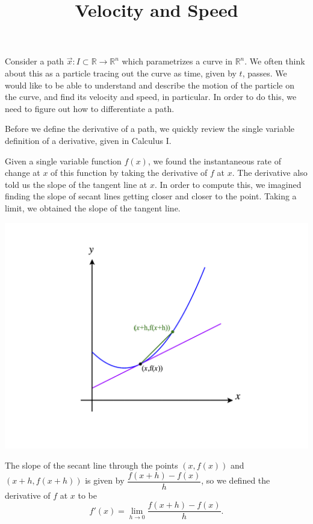 \documentclass{ximera}
\title{Velocity and Speed}
\begin{document}
\begin{abstract}
\end{abstract}
\maketitle


Consider a path $\vec{x}:I\subset\mathbb{R}\rightarrow\mathbb{R}^n$ which parametrizes a curve in $\mathbb{R}^n$. We often think about this as a particle tracing out the curve as time, given by $t$, passes. We would like to be able to understand and describe the motion of the particle on the curve, and find its velocity and speed, in particular. In order to do this, we need to figure out how to differentiate a path.

Before we define the derivative of a path, we quickly review the single variable definition of a derivative, given in Calculus I.

Given a single variable function $f(x)$, we found the instantaneous rate of change at $x$ of this function by taking the derivative of $f$ at $x$. The derivative also told us the slope of the tangent line at $x$. In order to compute this, we imagined finding the slope of secant lines getting closer and closer to the point. Taking a limit, we obtained the slope of the tangent line.

\begin{image}
\includegraphics[width=\textwidth]{CalcPlot3D-sv_deriv}
\end{image}

The slope of the secant line through the points $(x,f(x))$ and $(x+h,f(x+h))$ is given by $\dfrac{f(x+h)-f(x)}{h}$, so we defined the derivative of $f$ at $x$ to be
\[
f'(x) = \lim_{h\rightarrow 0}\frac{f(x+h)-f(x)}{h}.
\]
\end{document}
